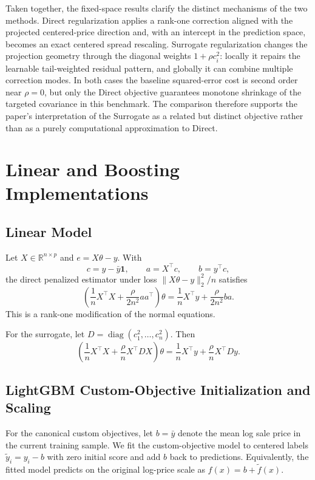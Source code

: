 \documentclass[10pt]{article}
\theoremstyle{definition}
\newcommand{\R}{\mathbb{R}}
\newcommand{\diag}{\operatorname{diag}}
\newcommand{\1}{\mathbf{1}}
\begin{document}
{

Taken together, the fixed-space results clarify the distinct mechanisms of the two methods. Direct regularization applies a rank-one correction aligned with the projected centered-price direction and, with an intercept in the prediction space, becomes an exact centered spread rescaling. Surrogate regularization changes the projection geometry through the diagonal weights $1+\rho c_i^2$: locally it repairs the learnable tail-weighted residual pattern, and globally it can combine multiple correction modes. In both cases the baseline squared-error cost is second order near $\rho=0$, but only the Direct objective guarantees monotone shrinkage of the targeted covariance in this benchmark. The comparison therefore supports the paper's interpretation of the Surrogate as a related but distinct objective rather than as a purely computational approximation to Direct.
}

\section{Linear and Boosting Implementations}
\label{app:implementation}


\subsection{Linear Model}

Let $X\in\R^{n\times p}$ and $e=X\theta-y$. With
\[
c=y-\bar y\1,\qquad a=X^\top c,\qquad b=y^\top c,
\]
the direct penalized estimator under loss $\|X\theta-y\|_2^2/n$ satisfies
\[
\left(
\frac{1}{n}X^\top X+\frac{\rho}{2n^2}aa^\top
\right)\theta
=
\frac{1}{n}X^\top y+\frac{\rho}{2n^2}ba.
\]
This is a rank-one modification of the normal equations.

For the surrogate, let $D=\diag(c_1^2,\ldots,c_n^2)$. Then
\[
\left(
\frac{1}{n}X^\top X+\frac{\rho}{n}X^\top DX
\right)\theta
=
\frac{1}{n}X^\top y+\frac{\rho}{n}X^\top Dy.
\]

\subsection{LightGBM Custom-Objective Initialization and Scaling}

For the canonical custom objectives, let $b=\bar y$ denote the mean log sale price
in the current training sample. We fit the custom-objective model to centered labels
$\widetilde y_i=y_i-b$ with zero initial score and add $b$ back to predictions.
Equivalently, the fitted model predicts on the original log-price scale as
$f(x)=b+\widetilde f(x)$.
\end{document}
